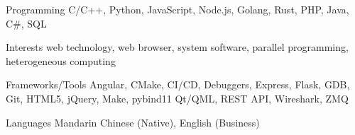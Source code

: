 
\begin{cvskills}
    \cvskill
    {Programming} %
    {C/C++, Python, JavaScript, Node.js, Golang, Rust, PHP, Java, C\#, SQL} %
    
    \cvskill
    {Interests} %
    {web technology, web browser, system software, parallel programming, heterogeneous computing} %

      \cvskill
        {Frameworks/Tools} %
        {Angular, CMake, CI/CD, Debuggers, Express, Flask, GDB, Git, HTML5, jQuery, Make, pybind11 \newline
        Qt/QML, REST API, Wireshark, ZMQ
        } %

      \cvskill
        {Languages} %
        {Mandarin Chinese (Native), English (Business)} %
    
\end{cvskills}
